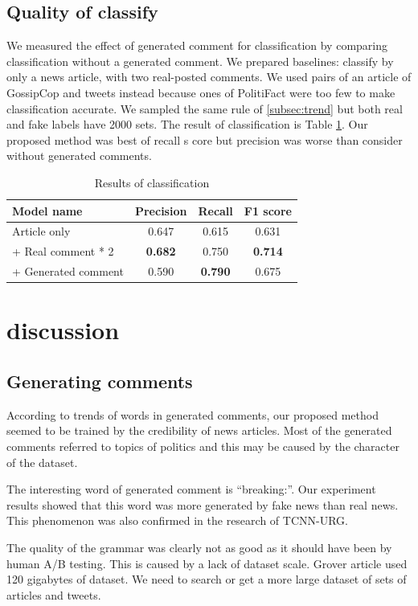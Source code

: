 \documentclass[conference]{IEEEtran}
\begin{document}
\subsection{Quality of classify}
We measured the effect of generated comment for classification by comparing classification without a generated comment.
We prepared baselines: classify by only a news article, with two real-posted comments.
We used pairs of an article of GossipCop and tweets instead because ones of PolitiFact were too few to make classification accurate.
We sampled the same rule of \ref{subsec:trend} but both real and fake labels have 2000 sets.
The result of classification is Table \ref{tbl:classify_results}.
Our proposed method was best of recall s core but precision was worse than consider without generated comments.
\begin{table}[!t]
    \renewcommand{\arraystretch}{1.3}
    \caption{Results of classification}
    \label{tbl:classify_results}
    \centering
    \begin{tabular}{lccc}
    \hline
    Model name           & Precision & Recall & F1 score \\ \hline
    Article only         & 0.647     & 0.615  & 0.631    \\
     + Real comment * 2  & \textbf{0.682}     & 0.750  & \textbf{0.714}    \\
     + Generated comment & 0.590     & \textbf{0.790}  & 0.675    \\ \hline
    \end{tabular}
    \end{table}
\section{discussion}
\subsection{Generating comments}
According to trends of words in generated comments, our proposed method seemed to be trained by the credibility of news articles.
Most of the generated comments referred to topics of politics and this may be caused by the character of the dataset.

The interesting word of generated comment is ``breaking:''.
Our experiment results showed that this word was more generated by fake news than real news.
This phenomenon was also confirmed in the research of TCNN-URG\cite{ijcai2018-533}.

The quality of the grammar was clearly not as good as it should have been by human A/B testing.
This is caused by a lack of dataset scale. 
Grover article used 120 gigabytes of dataset\cite{NIPS2019_9106}.
We need to search or get a more large dataset of sets of articles and tweets.
\end{document}
